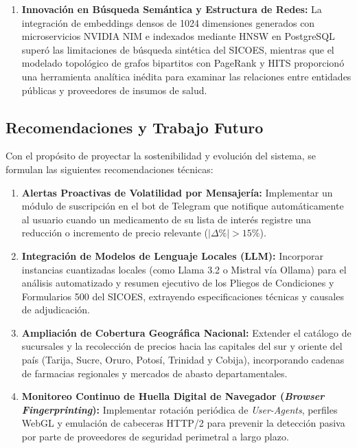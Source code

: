 \begin{enumerate}[leftmargin=*]
    \item \textbf{Innovación en Búsqueda Semántica y Estructura de Redes:} La integración de embeddings densos de 1024 dimensiones generados con microservicios NVIDIA NIM e indexados mediante HNSW en PostgreSQL superó las limitaciones de búsqueda sintética del SICOES, mientras que el modelado topológico de grafos bipartitos con PageRank y HITS proporcionó una herramienta analítica inédita para examinar las relaciones entre entidades públicas y proveedores de insumos de salud.
\end{enumerate}

\subsection{Recomendaciones y Trabajo Futuro}
Con el propósito de proyectar la sostenibilidad y evolución del sistema, se formulan las siguientes recomendaciones técnicas:

\begin{enumerate}[leftmargin=*]
    \item \textbf{Alertas Proactivas de Volatilidad por Mensajería:} Implementar un módulo de suscripción en el bot de Telegram que notifique automáticamente al usuario cuando un medicamento de su lista de interés registre una reducción o incremento de precio relevante ($|\Delta\%| > 15\%$).
    \item \textbf{Integración de Modelos de Lenguaje Locales (LLM):} Incorporar instancias cuantizadas locales (como Llama 3.2 o Mistral vía Ollama) para el análisis automatizado y resumen ejecutivo de los Pliegos de Condiciones y Formularios 500 del SICOES, extrayendo especificaciones técnicas y causales de adjudicación.
    \item \textbf{Ampliación de Cobertura Geográfica Nacional:} Extender el catálogo de sucursales y la recolección de precios hacia las capitales del sur y oriente del país (Tarija, Sucre, Oruro, Potosí, Trinidad y Cobija), incorporando cadenas de farmacias regionales y mercados de abasto departamentales.
    \item \textbf{Monitoreo Continuo de Huella Digital de Navegador (\textit{Browser Fingerprinting}):} Implementar rotación periódica de \textit{User-Agents}, perfiles WebGL y emulación de cabeceras HTTP/2 para prevenir la detección pasiva por parte de proveedores de seguridad perimetral a largo plazo.
\end{enumerate}
